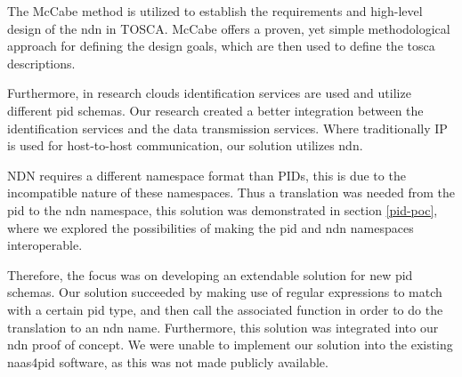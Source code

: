 The McCabe method \cite{mccabe2010network} is utilized to establish the requirements and high-level design of the \gls{ndn} in TOSCA. McCabe offers a proven, yet simple methodological approach for defining the design goals, which are then used to define the \gls{tosca} descriptions.

Furthermore, in research clouds identification services are used and utilize different \gls{pid} schemas. Our research created a better integration between the identification services and the data transmission services. Where traditionally IP is used for host-to-host communication, our solution utilizes \gls{ndn}.







NDN requires a different namespace format than PIDs, this is due to the incompatible nature of these namespaces. Thus a translation was needed from the \gls{pid} to the \gls{ndn} namespace, this solution was demonstrated in section \ref{pid-poc}, where we explored the possibilities of making the \gls{pid} and \gls{ndn} namespaces interoperable.

Therefore, the focus was on developing an extendable solution for new \gls{pid} schemas. Our solution succeeded by making use of regular expressions to match with a certain \gls{pid} type, and then call the associated function in order to do the translation to an \gls{ndn} name. Furthermore, this solution was integrated into our \gls{ndn} proof of concept. We were unable to implement our solution into the existing \gls{naas4pid} software, as this was not made publicly available.


